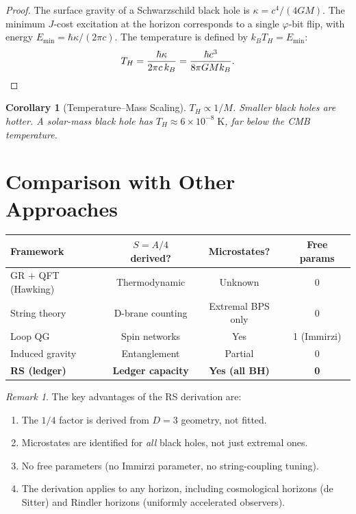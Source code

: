 \documentclass[12pt,a4paper]{article}
\newtheorem{corollary}[theorem]{Corollary}
\theoremstyle{definition}
\theoremstyle{remark}
\newtheorem{remark}[theorem]{Remark}
\begin{document}
\begin{proof}
The surface gravity of a Schwarzschild black hole is
$\kappa = c^4/(4GM)$.  The minimum $J$-cost excitation at
the horizon corresponds to a single $\varphi$-bit flip,
with energy $E_{\min} = \hbar\kappa/(2\pi c)$.  The
temperature is defined by $k_B T_H = E_{\min}$:
\begin{equation}
  T_H = \frac{\hbar\kappa}{2\pi c\,k_B}
  = \frac{\hbar c^3}{8\pi G M k_B}. \qedhere
\end{equation}
\end{proof}

\begin{corollary}[Temperature--Mass Scaling]
$T_H \propto 1/M$.  Smaller black holes are hotter.  A
solar-mass black hole has
$T_H \approx 6 \times 10^{-8}\;\mathrm{K}$, far below
the CMB temperature.
\end{corollary}

\section{Comparison with Other Approaches}
\label{sec:comparison}

\begin{center}
\renewcommand{\arraystretch}{1.3}
\begin{tabular}{@{}lccc@{}}
\toprule
\textbf{Framework} & \textbf{$S = A/4$ derived?} &
\textbf{Microstates?} & \textbf{Free params} \\
\midrule
GR + QFT (Hawking) & Thermodynamic & Unknown & 0 \\
String theory & D-brane counting & Extremal BPS only & 0 \\
Loop QG & Spin networks & Yes & 1 (Immirzi) \\
Induced gravity & Entanglement & Partial & 0 \\
\textbf{RS (ledger)} & \textbf{Ledger capacity}
& \textbf{Yes (all BH)} & \textbf{0} \\
\bottomrule
\end{tabular}
\end{center}

\begin{remark}
The key advantages of the RS derivation are:
\begin{enumerate}[nosep]
  \item The $1/4$ factor is derived from $D = 3$ geometry,
  not fitted.
  \item Microstates are identified for \emph{all} black
  holes, not just extremal ones.
  \item No free parameters (no Immirzi parameter, no
  string-coupling tuning).
  \item The derivation applies to any horizon, including
  cosmological horizons (de Sitter) and Rindler horizons
  (uniformly accelerated observers).
\end{enumerate}
\end{remark}
\end{document}
